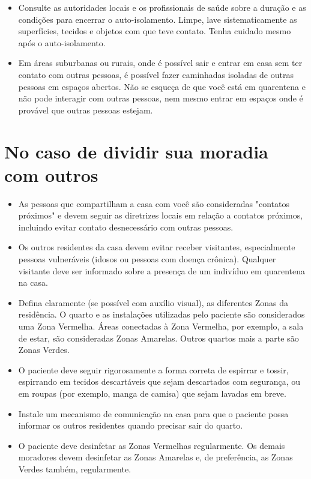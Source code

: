 \documentclass[onecolumn,journal]{IEEEtran}
\begin{document}
\begin{multicols}{2}
\begin{itemize}
\item Consulte as autoridades locais e os profissionais de saúde sobre a duração e as condições para encerrar o auto-isolamento. Limpe, lave sistematicamente as superfícies, tecidos e objetos com que teve contato. Tenha cuidado mesmo após o auto-isolamento.

\item Em áreas suburbanas ou rurais, onde é possível sair e entrar em casa sem ter contato com outras pessoas, é possível fazer caminhadas isoladas de outras pessoas em espaços abertos. Não se esqueça de que você está em quarentena e não pode interagir com outras pessoas, nem mesmo entrar em espaços onde é provável que outras pessoas estejam.
\end{itemize}

\section*{No caso de dividir sua moradia com outros}
\begin{itemize}
\item As pessoas que compartilham a casa com você são consideradas "contatos próximos" e devem seguir as diretrizes locais em relação a contatos próximos, incluindo evitar contato desnecessário com outras pessoas.
\item  Os outros residentes da casa devem evitar receber visitantes, especialmente pessoas vulneráveis (idosos ou pessoas com doença crônica). Qualquer visitante deve ser informado sobre a presença de um indivíduo em quarentena na casa.
\item Defina claramente (se possível com auxílio visual), as diferentes Zonas da residência. O quarto e as instalações utilizadas pelo paciente são considerados uma Zona Vermelha. Áreas conectadas à Zona Vermelha, por exemplo, a sala de estar, são consideradas Zonas Amarelas. Outros quartos mais a parte são Zonas Verdes.
\item O paciente deve seguir rigorosamente a forma correta de espirrar e tossir, espirrando em tecidos descartáveis que sejam descartados com segurança, ou em roupas (por exemplo, manga de camisa) que sejam lavadas em breve.
\item Instale um mecanismo de comunicação na casa para que o paciente possa informar os outros residentes quando precisar sair do quarto.
\item O paciente deve desinfetar as Zonas Vermelhas regularmente. Os demais moradores devem desinfetar as Zonas Amarelas e, de preferência, as Zonas Verdes também, regularmente.

\end{itemize}
\end{multicols}
\end{document}
